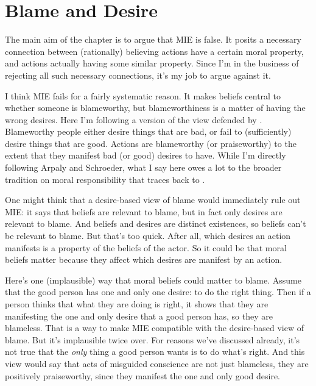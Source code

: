 \section{Blame and Desire}
\label{blameanddesire}

The main aim of the chapter is to argue that MIE is false. It posits a necessary connection between (rationally) believing actions have a certain moral property, and actions actually having some similar property. Since I'm in the business of rejecting all such necessary connections, it's my job to argue against it.

I think MIE fails for a fairly systematic reason. It makes beliefs central to whether someone is blameworthy, but blameworthiness is a matter of having the wrong desires. Here I'm following a version of the view defended by \citet{ArpalySchroeder2014}. Blameworthy people either desire things that are bad, or fail to (sufficiently) desire things that are good. Actions are blameworthy (or praiseworthy) to the extent that they manifest bad (or good) desires to have. While I'm directly following Arpaly and Schroeder, what I say here owes a lot to the broader tradition on moral responsibility that traces back to \citet{Strawson1962}.

One might think that a desire-based view of blame would immediately rule out MIE: it says that beliefs are relevant to blame, but in fact only desires are relevant to blame. And beliefs and desires are distinct existences, so beliefs can't be relevant to blame. But that's too quick. After all, which desires an action manifests is a property of the beliefs of the actor. So it could be that moral beliefs matter because they affect which desires are manifest by an action.

Here's one (implausible) way that moral beliefs could matter to blame. Assume that the good person has one and only one desire: to do the right thing. Then if a person thinks that what they are doing is right, it shows that they are manifesting the one and only desire that a good person has, so they are blameless. That is a way to make MIE compatible with the desire-based view of blame. But it's implausible twice over. For reasons we've discussed already, it's not true that the \emph{only} thing a good person wants is to do what's right. And this view would say that acts of misguided conscience are not just blameless, they are positively praiseworthy, since they manifest the one and only good desire.

